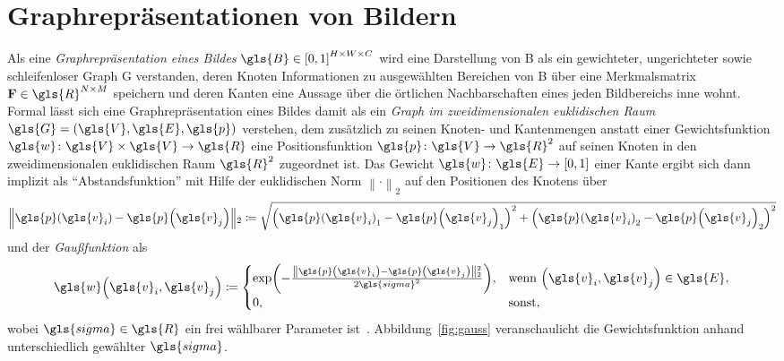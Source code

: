 \chapter{Graphrepräsentationen von Bildern}
\label{graphrepraesentationen_von_bildern}

Als eine \emph{Graphrepräsentation eines Bildes} $\gls{B} \in {\left[0, 1\right]}^{H \times W \times C}$ wird eine Darstellung von \gls{B} als ein gewichteter, ungerichteter sowie schleifenloser Graph \gls{G} verstanden, deren Knoten Informationen zu ausgewählten Bereichen von \gls{B} über eine Merkmalsmatrix $\ma{F} \in \gls{R}^{N \times M}$ speichern und deren Kanten eine Aussage über die örtlichen Nachbarschaften eines jeden Bildbereichs inne wohnt.
Formal lässt sich eine Graphrepräsentation eines Bildes damit als ein \emph{Graph im zweidimensionalen euklidischen Raum} $\gls{G} = \left(\gls{V}, \gls{E}, \gls{p}\right)$ verstehen, dem zusätzlich zu seinen Knoten- und Kantenmengen anstatt einer Gewichtsfunktion $\gls{w} \colon \gls{V} \times \gls{V} \to \gls{R}$ eine Positionsfunktion $\gls{p} \colon \gls{V} \to \gls{R}^2$ auf seinen Knoten in den zweidimensionalen euklidischen Raum $\gls{R}^2$ zugeordnet ist.
Das Gewicht $\gls{w} \colon \gls{E} \to \left[0, 1\right]$ einer Kante ergibt sich dann implizit als \enquote{Abstandsfunktion} mit Hilfe der euklidischen Norm $\left\|\cdot\right\|_2$ auf den Positionen des Knotens über
\begin{equation*}
  \left\|\gls{p}\left(\gls{v}_i\right) - \gls{p}\left(\gls{v}_j\right) \right\|_2 \coloneqq \sqrt{{\left({\gls{p}\left(\gls{v}_i\right)}_1 - {\gls{p}\left(\gls{v}_j\right)}_1\right)}^2 + {\left({\gls{p}\left(\gls{v}_i\right)}_2 - {\gls{p}\left(\gls{v}_j\right)}_2\right)}^2}
\end{equation*}
und der \emph{Gaußfunktion} als
\begin{equation}
  \gls{w}\left(\gls{v}_i, \gls{v}_j\right) \coloneqq \begin{cases}
    \exp\left(-\frac{\left\|\gls{p}\left(\gls{v}_i\right) - \gls{p}\left(\gls{v}_j\right)\right\|_2^2}{2\gls{sigma}^2}\right), & \text{wenn }\left(\gls{v}_i, \gls{v}_j\right) \in \gls{E},\\
    0, & \text{sonst},
  \end{cases}
  \label{gauss}
\end{equation}
wobei $\gls{sigma} \in \gls{R}$ ein frei wählbarer Parameter ist~\cite{Shuman}.
Abbildung~\ref{fig:gauss} veranschaulicht die Gewichtsfunktion anhand unterschiedlich gewählter $\gls{sigma}$.

